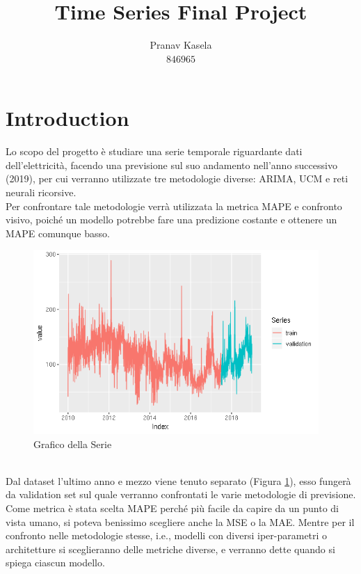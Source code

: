 \documentclass[12pt, onecolumn]{article}
\title{Time Series Final Project}
\author{Pranav Kasela \\$846965$}
\date{}
\begin{document}
\maketitle

\section*{Introduction}
Lo scopo del progetto è studiare una serie temporale riguardante dati dell'elettricità, facendo una previsione sul suo andamento nell'anno successivo (2019), per cui verranno utilizzate tre metodologie diverse: ARIMA, UCM e reti neurali ricorsive.\\
Per confrontare tale metodologie verrà utilizzata la metrica MAPE e confronto visivo, poiché un modello potrebbe fare una predizione costante e ottenere un MAPE comunque basso.
\begin{figure}[!h]
  \centering
  \includegraphics[width=\linewidth, height=7cm]{imgs/Series.png}
  \caption{Grafico della Serie}
  \label{fig:series}
\end{figure}\\
Dal dataset l'ultimo anno e mezzo viene tenuto separato (Figura \ref{fig:series}), esso fungerà da validation set sul quale verranno confrontati le varie metodologie di previsione.
Come metrica è stata scelta MAPE perché più facile da capire da un punto di vista umano, si poteva benissimo scegliere anche la MSE o la MAE.
Mentre per il confronto nelle metodologie stesse, i.e., modelli con diversi iper-parametri o architetture si sceglieranno delle metriche diverse, e verranno dette quando si spiega ciascun modello.
\end{document}
